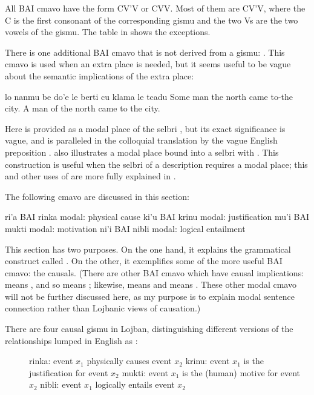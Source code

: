 All BAI cmavo have the form CV'V or CVV. Most of them are
    CV'V, where the C is the first consonant of the corresponding
    gismu and the two Vs are the two vowels of the gismu. The table
    in  shows the exceptions.

There is one additional BAI cmavo that is not derived from a
    gismu: . This cmavo is used when an extra place is
    needed, but it seems useful to be vague about the semantic
    implications of the extra place:
\begin{example}
lo nanmu be do'e le berti cu klama le tcadu\n
Some man  the north came to-the city.\n
A man of the north came to the city.
\end{example}

Here  is provided as a modal place of the selbri
    , but its exact significance is vague, and is
    paralleled in the colloquial translation by the vague English
    preposition .  also
    illustrates a modal place bound into a selbri with . This
    construction is useful when the selbri of a description
    requires a modal place; this and other uses of  are more
    fully explained in .



The following cmavo are discussed in this section:

   ri'a    BAI rinka modal: physical cause
    ki'u    BAI krinu modal: justification
    mu'i    BAI mukti modal: motivation
    ni'i    BAI nibli modal: logical entailment

This section has two purposes. On the one hand, it explains
    the grammatical construct called .
    On the other, it exemplifies some of the more useful BAI cmavo:
    the causals. (There are other BAI cmavo which have causal
    implications:  means , and so 
    means ; likewise, 
    means  and  means .
    These other modal cmavo will not be further discussed here, as
    my purpose is to explain modal sentence connection rather than
    Lojbanic views of causation.)

There are four causal gismu in Lojban, distinguishing
    different versions of the relationships lumped in English as
    :
\begin{description}
\item[] rinka: event $x_1$ physically causes event $x_2$ krinu: event $x_1$ is the justification for event $x_2$ mukti: event $x_1$ is the (human) motive for event $x_2$ nibli: event $x_1$ logically entails event $x_2$
\end{description}

